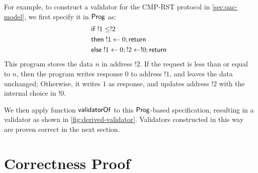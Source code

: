 For example, to construct a validator for the CMP-RST protocol in
\autoref{sec:qac-model}, we first specify it in $\mathsf{Prog}$ as:
\begin{align*}
  &\mathsf{if}\;!1\le!2\\
  &\mathsf{then}\;!1\gets0;\mathsf{return}\\
  &\mathsf{else}\;!1\gets0;!2\gets!0;\mathsf{return}
\end{align*}
This program stores the data $n$ in address $!2$.  If the request is less than
or equal to $n$, then the program writes response $0$ to address $!1$, and
leaves the data unchanged; Otherwise, it writes $1$ as response, and updates
address $!2$ with the internal choice in $!0$.

We then apply function $\mathsf{validatorOf}$ to this $\mathsf{Prog}$-based specification,
resulting in a validator as shown in \autoref{fig:derived-validator}.
Validators constructed in this way are proven correct in the next
section.

\section{Correctness Proof}
\label{sec:proof}

